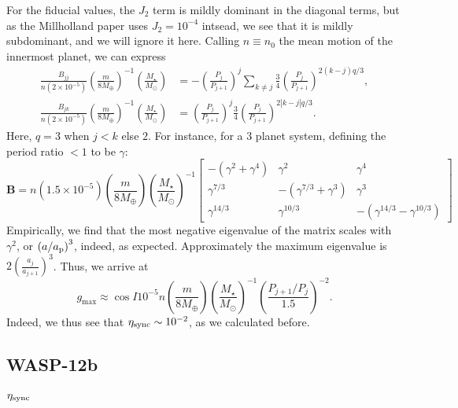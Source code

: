 \documentclass[11pt,
        usenames, %
        dvipsnames %
    ]{article}
\newcommand*{\bm}[1]{\boldsymbol{\mathbf{#1}}}
\newcommand*{\p}[1]{\left(#1\right)}
\begin{document}
For the fiducial values, the $J_2$ term is mildly dominant in the diagonal
terms, but as the Millholland paper uses $J_2 = 10^{-4}$ intsead, we see that it
is mildly subdominant, and we will ignore it here. Calling $n \equiv n_0$ the
mean motion of the innermost planet, we can express
\begin{align}
    \frac{B_{jj}}{n \p{2 \times 10^{-5}}}
        \p{\frac{m}{8 M_{\oplus}}}^{-1}
        \p{\frac{M_\star}{M_{\odot}}}
        &= -\p{\frac{P_j}{P_{j + 1}}}^{j} \sum\limits_{k \neq j}
            \frac{3}{4}\p{\frac{P_j}{P_{j+1}}}^{2(k - j)q/3},\\
    \frac{B_{jk}}{n \p{2 \times 10^{-5}}}
        \p{\frac{m}{8 M_{\oplus}}}^{-1}
        \p{\frac{M_\star}{M_{\odot}}}
        &= \p{\frac{P_j}{P_{j + 1}}}^{j}
            \frac{3}{4}\p{\frac{P_j}{P_{j+1}}}^{2|k - j|q/3}.
\end{align}
Here, $q = 3$ when $j < k$ else $2$. For instance, for a 3 planet system,
defining the period ratio $< 1$ to be $\gamma$:
\begin{equation}
    \bm{B} = n\p{1.5 \times 10^{-5}}
        \p{\frac{m}{8 M_{\oplus}}}
        \p{\frac{M_\star}{M_{\odot}}}^{-1}
        \begin{bmatrix}
            -(\gamma^2 + \gamma^4) & \gamma^2 & \gamma^{4}\\
            \gamma^{7/3} & -(\gamma^{7/3} + \gamma^3) & \gamma^3\\
            \gamma^{14/3} & \gamma^{10/3} & -\p{\gamma^{14/3} - \gamma^{10/3}}
    \end{bmatrix}
\end{equation}
Empirically, we find that the most negative eigenvalue of the matrix scales with
$\gamma^{2}$, or $\p{a / a_{\rm p}}^{3}$, indeed, as expected. Approximately the
maximum eigenvalue is $2\p{\frac{a_j}{a_{j + 1}}}^3$. Thus, we arrive at
\begin{equation}
    g_{\max} \approx \cos I 10^{-5}n\p{\frac{m}{8M_{\oplus}}}
        \p{\frac{M_{\star}}{M_{\odot}}}^{-1}\p{\frac{P_{j + 1} /
        P_j}{1.5}}^{-2}.
\end{equation}
Indeed, we thus see that $\eta_{\rm sync} \sim 10^{-2}$, as we calculated
before.

\subsection{WASP-12b}

\subsubsection{$\eta_{\rm sync}$}
\end{document}

